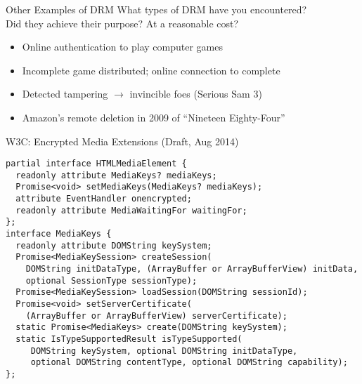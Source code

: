 \documentclass{beamer}
\begin{document}
\begin{frame}{Other Examples of DRM}
What types of DRM have you encountered? \\
\bigskip
Did they achieve their purpose? At a reasonable cost?\\
\bigskip
\pause
\begin{itemize}
\item Online authentication to play computer games
\item Incomplete game distributed; online connection to complete
\item Detected tampering $\rightarrow$ invincible foes (Serious Sam 3)
\item Amazon's remote deletion in 2009 of ``Nineteen Eighty-Four''
\end{itemize}
\end{frame}

\begin{frame}[fragile]{W3C: Encrypted Media Extensions (Draft, Aug 2014)}
\footnotesize
\begin{lstlisting}
partial interface HTMLMediaElement {
  readonly attribute MediaKeys? mediaKeys;
  Promise<void> setMediaKeys(MediaKeys? mediaKeys);
  attribute EventHandler onencrypted;
  readonly attribute MediaWaitingFor waitingFor;
};
interface MediaKeys {
  readonly attribute DOMString keySystem;
  Promise<MediaKeySession> createSession(
    DOMString initDataType, (ArrayBuffer or ArrayBufferView) initData,
    optional SessionType sessionType);
  Promise<MediaKeySession> loadSession(DOMString sessionId);
  Promise<void> setServerCertificate(
    (ArrayBuffer or ArrayBufferView) serverCertificate);
  static Promise<MediaKeys> create(DOMString keySystem);
  static IsTypeSupportedResult isTypeSupported(
     DOMString keySystem, optional DOMString initDataType,
     optional DOMString contentType, optional DOMString capability);
};
\end{lstlisting}
%
%  
\end{frame}
\end{document}
